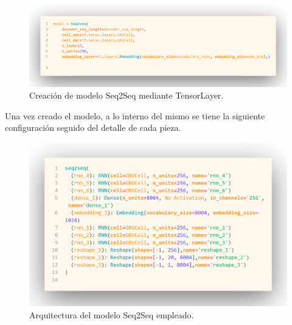 \documentclass[12pt, letterpaper]{article}
\begin{document}
        \begin{figure}[H]
            \centering
            \includegraphics[width=\linewidth]{img/code/seq2seq_model.png}
            \caption{Creación de modelo Seq2Seq mediante TensorLayer.}
        \end{figure}
        
        Una vez creado el modelo, a lo interno del mismo se tiene la siguiente configuración seguido del detalle de cada pieza.
    
        \begin{figure}[H]
            \centering
            \includegraphics[width=\linewidth]{img/code/seq2seq_arq.png}
            \caption{Arquitectura del modelo Seq2Seq empleado.}
        \end{figure}
        
\end{document}
